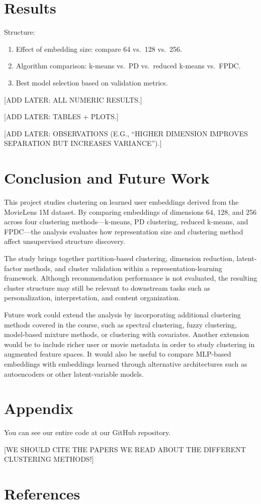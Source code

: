 \documentclass[
  11pt,
]{article}
\providecommand{\tightlist}{%
  \setlength{\itemsep}{0pt}\setlength{\parskip}{0pt}}
\begin{document}
\section{Results}\label{results}

Structure:

\begin{enumerate}
\def\labelenumi{\arabic{enumi}.}
\tightlist
\item
  Effect of embedding size: compare 64 vs.~128 vs.~256.
\item
  Algorithm comparison: k-means vs.~PD vs.~reduced k-means vs.~FPDC.
\item
  Best model selection based on validation metrics.
\end{enumerate}

{[}ADD LATER: ALL NUMERIC RESULTS.{]}

{[}ADD LATER: TABLES + PLOTS.{]}

{[}ADD LATER: OBSERVATIONS (E.G., ``HIGHER DIMENSION IMPROVES SEPARATION
BUT INCREASES VARIANCE'').{]}

\section{Conclusion and Future Work}\label{conclusion-and-future-work}

This project studies clustering on learned user embeddings derived from
the MovieLens 1M dataset. By comparing embeddings of dimensions 64, 128,
and 256 across four clustering methods---k-means, PD clustering, reduced
k-means, and FPDC---the analysis evaluates how representation size and
clustering method affect unsupervised structure discovery.

The study brings together partition-based clustering, dimension
reduction, latent-factor methods, and cluster validation within a
representation-learning framework. Although recommendation performance
is not evaluated, the resulting cluster structure may still be relevant
to downstream tasks such as personalization, interpretation, and content
organization.

Future work could extend the analysis by incorporating additional
clustering methods covered in the course, such as spectral clustering,
fuzzy clustering, model-based mixture methods, or clustering with
covariates. Another extension would be to include richer user or movie
metadata in order to study clustering in augmented feature spaces. It
would also be useful to compare MLP-based embeddings with embeddings
learned through alternative architectures such as autoencoders or other
latent-variable models.

\section{Appendix}\label{appendix}

You can see our entire code at our GitHub repository.

{[}WE SHOULD CITE THE PAPERS WE READ ABOUT THE DIFFERENT CLUSTERING
METHODS!{]}

\section{References}\label{references}
\end{document}
